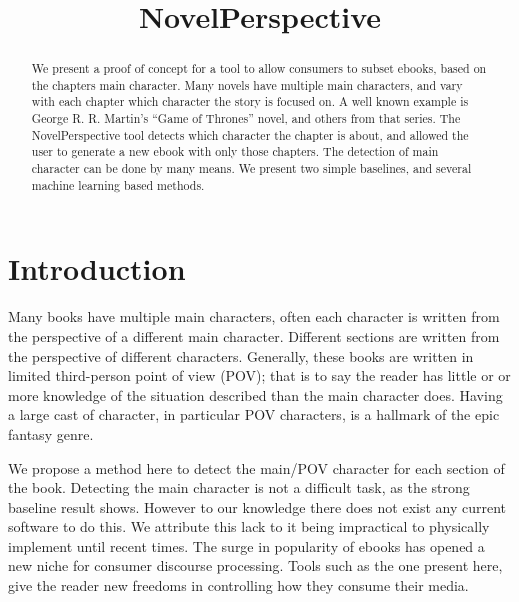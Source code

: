 \documentclass[11pt,a4paper]{article}
\title{NovelPerspective}
\begin{document}
\maketitle

\begin{abstract}
We present a proof of concept for a tool to allow consumers to subset ebooks, based on the chapters main character.
Many novels have multiple main characters, and vary with each chapter which character the story is focused on.
A well known example is George R. R. Martin's ``Game of Thrones'' novel, and others from that series.
The NovelPerspective tool detects which character the chapter is about,
and allowed the user to generate a new ebook with only those chapters.
The detection of main character can be done by many means.
We present two simple baselines, and several machine learning based methods.
\end{abstract}

\section{Introduction}

Many books have multiple main characters, often each character is written from the perspective of a different main character.
Different sections are written from the perspective of different characters.
Generally, these books are written in limited third-person point of view (POV);
that is to say the reader has little or or more knowledge of the situation described than the main character does.
Having a large cast of character, in particular POV characters, is a hallmark of the epic fantasy genre.

We propose a method here to detect the main/POV character for each section of the book.
Detecting the main character is not a difficult task, as the strong baseline result shows.
However to our knowledge there does not exist any current software to do this.
We attribute this lack to it being impractical to physically implement until recent times.
The surge in popularity of ebooks has opened a new niche for consumer discourse processing.
Tools such as the one present here, give the reader new freedoms in controlling how they consume their media.
\end{document}
